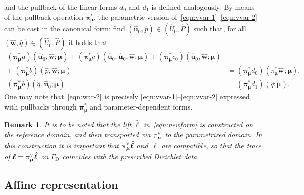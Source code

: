 \documentclass[onecolumn, twoside, a4paper, 11pt]{article}
\newtheorem{remark}{Remark}
\begin{document}
%
and the pullback of the linear forms $d_0$ and $d_1$ is defined analogously. By means of the
pullback operation ${\bm\pi}^*_{\bm\mu}$, the parametric version
of~\eqref{eqn:vvar-1}\nobreakdash--\eqref{eqn:vvar-2} can be cast
in the canonical form: find $(\hat{\bm u}_0, \hat{p}) \in (\hat{U}_0, \hat{P})$ such
that, for all $(\hat{\bm w}, \hat{q}) \in (\hat{U}_0, \hat{P})$ it holds
that
%
\begin{align}
  \nonumber (\bm\pi_{\bm\mu}^* a)(
    \hat{\bm u}_0,
    \hat{\bm w};
    \bm \mu
  ) + (\bm\pi_{\bm\mu}^* c)(
    \hat{\bm u}_0,
    \hat{\bm u}_0,
    \hat{\bm w};
    \bm \mu
  ) + (\bm\pi_{\bm\mu}^* c_0)(
    \hat{\bm u}_0,
    \hat{\bm w};
    \bm \mu
  )
  \\
  + \; (\bm\pi_{\bm\mu}^* b)(
    \hat{p},
    \hat{\bm w};
    \bm \mu
  ) &= (\bm\pi_{\bm\mu}^* d_0)(
    \pi_{\bm \mu}^* \hat{\bm w};
    \bm \mu
  )
  \label{eqn:war-1}, \\
  (\bm\pi_{\bm\mu}^* b)(
    \hat{q},
    \hat{\bm u}_0;
    \bm \mu
  ) &= (\bm\pi_{\bm\mu}^* d_1)(
    \hat{q};
    \bm \mu
  ). \label{eqn:war-2}
\end{align}
%
One may note that~\eqref{eqn:war-2} is precisely \eqref{eqn:vvar-1}--\eqref{eqn:vvar-2} expressed
with pullbacks through $\bm \pi_{\bm \mu}^*$ and parameter-dependent forms.


\begin{remark}
  \label{rem:lift}
  It is to be noted that the lift $\hat{\bm \ell}$ in~\eqref{eqn:newform} is constructed on
  the reference domain, and then transported
  via $\pi_{\bm \mu}^\textsc{v}$ to the parametrized domain. In this construction it is important
  that $\smash[t]{\pi_{\bm \mu}^\textsc{v} \hat{\bm \ell}}$ and~${\bm \ell}$ are compatible, so that
  the trace of $\bm{\ell}=\smash[t]{\pi_{\bm \mu}^\textsc{v}\hat{\bm \ell}}$ on $\Gamma_\text{D}$
  coincides with the prescribed Dirichlet data.
\end{remark}

\subsection{Affine representation}
\label{sec:affrep}
\end{document}
